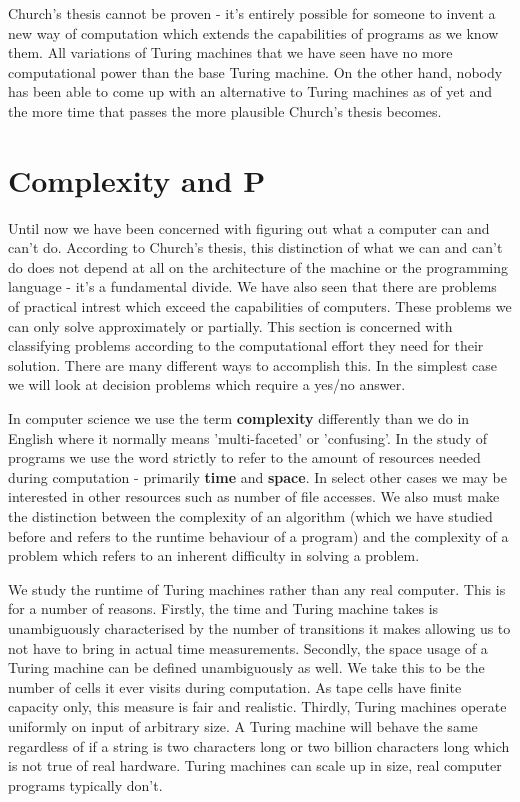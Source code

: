 \documentclass[11pt]{article}
\begin{document}
	\par Church's thesis cannot be proven - it's entirely possible for someone to invent a new way of computation which extends the capabilities of programs as we know them. All variations of Turing machines that we have seen have no more computational power than the base Turing machine. On the other hand, nobody has been able to come up with an alternative to Turing machines as of yet and the more time that passes the more plausible Church's thesis becomes.
	
	\section{Complexity and P}
	Until now we have been concerned with figuring out what a computer can and can't do. According to Church's thesis, this distinction of what we can and can't do does not depend at all on the architecture of the machine or the programming language - it's a fundamental divide. We have also seen that there are problems of practical intrest which exceed the capabilities of computers. These problems we can only solve approximately or partially. This section is concerned with classifying problems according to the computational effort they need for their solution. There are many different ways to accomplish this. In the simplest case we will look at decision problems which require a yes/no answer.
	
	\par 
	In computer science we use the term \textbf{complexity} differently than we do in English where it normally means 'multi-faceted' or 'confusing'. In the study of programs we use the word strictly to refer to the amount of resources needed during computation - primarily \textbf{time} and \textbf{space}. In select other cases we may be interested in other resources such as number of file accesses. We also must make the distinction between the complexity of an algorithm (which we have studied before and refers to the runtime behaviour of a program) and the complexity of a problem which refers to an inherent difficulty in solving a problem. 
	
	\par 
	We study the runtime of Turing machines rather than any real computer. This is for a number of reasons. Firstly, the time and Turing machine takes is unambiguously characterised by the number of transitions it makes allowing us to not have to bring in actual time measurements. Secondly, the space usage of a Turing machine can be defined unambiguously as well. We take this to be the number of cells it ever visits during computation. As tape cells have finite capacity only, this measure is fair and realistic. Thirdly, Turing machines operate uniformly on input of arbitrary size. A Turing machine will behave the same regardless of if a string is two characters long or two billion characters long which is not true of real hardware. Turing machines can scale up in size, real computer programs typically don't.
	
\end{document}
